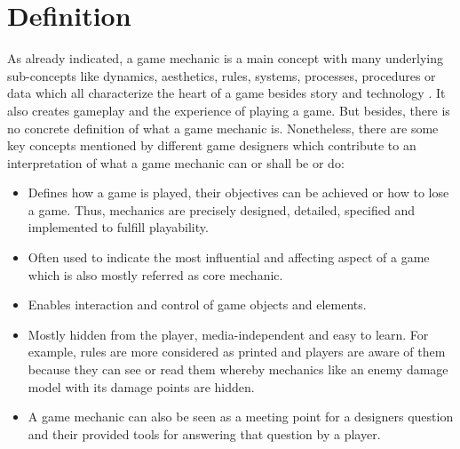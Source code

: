 \documentclass[MGS,Master,english]{twbook}%
\begin{document}
\section{Definition}
As already indicated, a game mechanic is a main concept with many underlying sub-concepts like dynamics, aesthetics, rules, systems, processes, procedures or data which all characterize the heart of a game besides story and technology \cite{gameDesign::gameMechanicsAdvancedGameDesign} \cite{gameDesign::bookOfLenses}. It also creates gameplay and the experience of playing a game. But besides, there is no concrete definition of what a game mechanic is. Nonetheless, there are some key concepts mentioned by different game designers which contribute to an interpretation of what a game mechanic can or shall be or do:
\begin{itemize}
	\item Defines how a game is played, their objectives can be achieved or how to lose a game. Thus, mechanics are precisely designed, detailed, specified and implemented to fulfill playability. \cite{gameDesign::gameMechanicsAdvancedGameDesign} \cite{gameDesign::bookOfLenses}
	\item Often used to indicate the most influential and affecting aspect of a game which is also mostly referred as core mechanic. \cite{gameDesign::gameMechanicsAdvancedGameDesign}
	\item Enables interaction and control of game objects and elements. \cite{gameDesign::gameMechanicsAdvancedGameDesign}
	\item Mostly hidden from the player, media-independent and easy to learn. For example, rules are more considered as printed and players are aware of them because they can see or read them whereby mechanics like an enemy damage model with its damage points are hidden. \cite{gameDesign::gameMechanicsAdvancedGameDesign}
	\item A game mechanic can also be seen as a meeting point for a designers question and their provided tools for answering that question by a player. \cite{mechanic::gamasutra::MikeStout}
\end{itemize}
\end{document}

